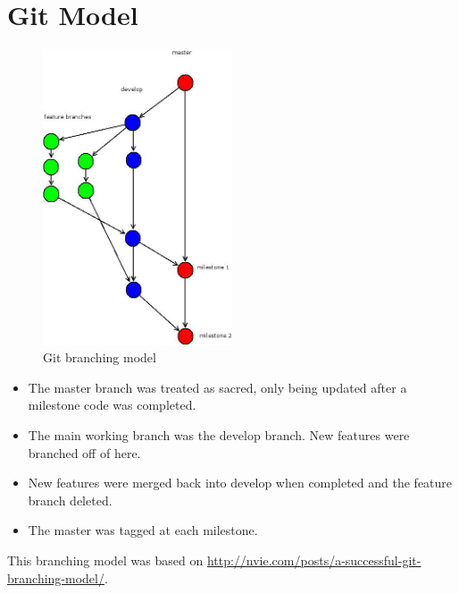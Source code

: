 \section{Git Model}
\label{apx:git}

\begin{figure}[h]
  \caption{Git branching model}
  \centering
    \includegraphics[width=0.5\textwidth]{gitbranch.jpg}
\end{figure}

\begin{itemize}
    \item The master branch was treated as sacred, only being updated after
    a milestone code was completed.
    \item The main working branch was the develop branch. New features were
    branched off of here.
    \item New features were merged back into develop when completed and the
    feature branch deleted.
    \item The master was tagged at each milestone.
\end{itemize}

This branching model was based on
\url{http://nvie.com/posts/a-successful-git-branching-model/}.

